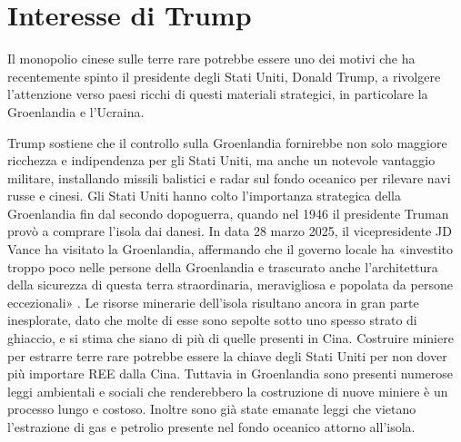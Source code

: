 \documentclass[12pt,a4paper,oneside]{book}
\begin{document}
\section{Interesse di Trump}
Il monopolio cinese sulle terre rare potrebbe essere uno dei motivi che ha recentemente spinto il presidente degli Stati Uniti, Donald Trump, a rivolgere l'attenzione verso paesi ricchi di questi materiali strategici, in particolare la Groenlandia e l'Ucraina.

Trump sostiene che il controllo sulla Groenlandia fornirebbe non solo maggiore ricchezza e indipendenza per gli Stati Uniti, ma anche un notevole vantaggio militare, installando missili balistici e radar sul fondo oceanico per rilevare navi russe e cinesi.
Gli Stati Uniti hanno colto l'importanza strategica della Groenlandia fin dal secondo dopoguerra, quando nel 1946 il presidente Truman provò a comprare l'isola dai danesi. In data 28 marzo 2025, il vicepresidente JD Vance ha visitato la Groenlandia, affermando che il governo locale ha «investito troppo poco nelle persone della Groenlandia e trascurato anche l'architettura della sicurezza di questa terra straordinaria, meravigliosa e popolata da persone eccezionali» \cite{foxnews2024greenland}. 
Le risorse minerarie dell'isola risultano ancora in gran parte inesplorate, dato che molte di esse sono sepolte sotto uno spesso strato di ghiaccio, e si stima che siano di più di quelle presenti in Cina. Costruire miniere per estrarre terre rare potrebbe essere la chiave degli Stati Uniti per non dover più importare REE dalla Cina.
Tuttavia in Groenlandia sono presenti numerose leggi ambientali e sociali che renderebbero la costruzione di nuove miniere è un processo lungo e costoso. Inoltre sono già state emanate leggi che vietano l'estrazione di gas e petrolio presente nel fondo oceanico attorno all'isola.
\end{document}

